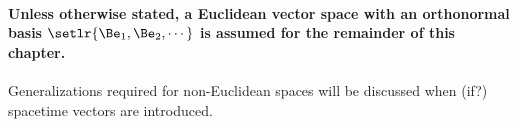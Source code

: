 %
%
\paragraph{Unless otherwise stated, a Euclidean vector space with an orthonormal basis \( \setlr{\Be_1, \Be_2, \cdots } \) is assumed for the remainder of this chapter.}
Generalizations required for non-Euclidean spaces will be discussed when (if?) spacetime vectors are introduced.
